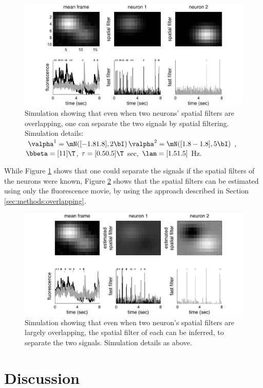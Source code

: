 \begin{figure}[h!]
\centering \includegraphics[width=.9\linewidth]{../figs/spatial_multi_inf}
\caption{Simulation showing that even when two neurons' spatial filters are overlapping, one can separate the two signals by spatial filtering. Simulation details: $\valpha^1=\mN([-1.8 1.8],2 \bI)\, \valpha^2=\mN([1.8 -1.8],5 \bI)$, $\bbeta=[1 1]\T$, $\tau=[0.5 0.5]\T$ sec, $\lam=[1.5 1.5]$ Hz.} \label{fig:spatial_multi_inf}
\end{figure}

While Figure \ref{fig:spatial_multi_inf} shows that one could separate the signals if the spatial filters of the neurons were known, Figure \ref{fig:spatial_multi_learn} shows that the spatial filters can be estimated using only the fluorescence movie, by using the approach described in Section \ref{sec:methods:overlapping}.


\begin{figure}[h!]
\centering \includegraphics[width=.9\linewidth]{../figs/spatial_multi_learn}
\caption{Simulation showing that even when two neuron's spatial filters are largely overlapping, the spatial filter of each can be inferred, to separate the two signals. Simulation details as above.} \label{fig:spatial_multi_learn}
\end{figure}





\section{Discussion} \label{sec:dis}

